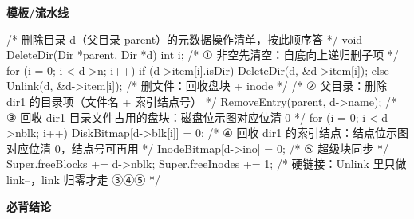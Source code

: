 \documentclass[10pt,a4paper]{ctexart}
\begin{document}
\textbf{模板/流水线}

\begin{codebox}
/* 删除目录 d（父目录 parent）的元数据操作清单，按此顺序答 */
void DeleteDir(Dir *parent, Dir *d) {
    int i;
    /* ① 非空先清空：自底向上递归删子项 */
    for (i = 0; i < d->n; i++) {
        if (d->item[i].isDir) DeleteDir(d, &d->item[i]);
        else Unlink(d, &d->item[i]);           /* 删文件：回收盘块 + inode */
    }
    /* ② 父目录：删除 dir1 的目录项（文件名 + 索引结点号） */
    RemoveEntry(parent, d->name);
    /* ③ 回收 dir1 目录文件占用的盘块：磁盘位示图对应位清 0 */
    for (i = 0; i < d->nblk; i++) DiskBitmap[d->blk[i]] = 0;
    /* ④ 回收 dir1 的索引结点：结点位示图对应位清 0，结点号可再用 */
    InodeBitmap[d->ino] = 0;
    /* ⑤ 超级块同步 */
    Super.freeBlocks += d->nblk;
    Super.freeInodes += 1;
}
/* 硬链接：Unlink 里只做 link--，link 归零才走 ③④⑤ */
\end{codebox}




\textbf{必背结论}
\end{document}
